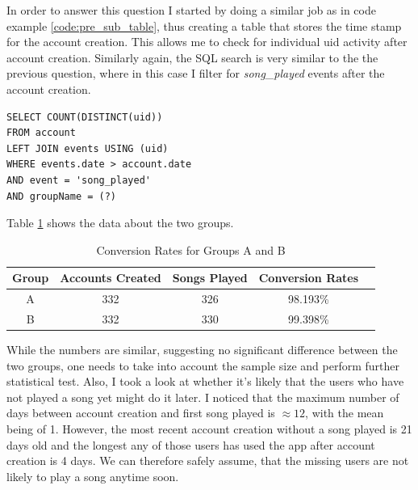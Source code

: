 \documentclass[paper=a4, fontsize=10pt]{report}
\begin{document}
\vspace{.8cm}

In order to answer this question I started by doing a similar job as in code example \ref{code:pre_sub_table}, thus creating a table that stores the time stamp
for the account creation. This allows me to check for individual uid activity after account creation. Similarly again, the SQL search is very similar to the 
the previous question, where in this case I filter for \textit{song\_played} events after the account creation.


\footnotesize
\begin{lstlisting}[frame=single,caption=Conversion rates \label{code:sql_conversion_rates}]
SELECT COUNT(DISTINCT(uid)) 
FROM account 
LEFT JOIN events USING (uid)
WHERE events.date > account.date
AND event = 'song_played'
AND groupName = (?)
\end{lstlisting}
\normalsize

Table \ref{tab:conversion_rates} shows the data about the two groups.
\begin{table}[htbp]
\normalsize

  \centering
  \caption{Conversion Rates for Groups A and B}
    \begin{tabular}{ccccc}
    \toprule
    \textbf{Group } & \textbf{Accounts Created} & \textbf{Songs Played} & \textbf{Conversion Rates} \\
    \midrule
    A & 332  &  326  & 98.193\%  \\
    B & 332   & 330   & 99.398\%   \\
    \bottomrule
    \end{tabular}%
  \label{tab:conversion_rates}%
\end{table}%
\normalsize
While the numbers are similar, suggesting no significant difference between the two groups, one needs to take into account the sample size and perform
further statistical test. Also, I took a look at whether it's likely that the users who have not played a song yet might
do it later. I noticed that the maximum number of days between account creation and first song played is $\approx 12$, with the mean
being of 1. However, the most recent account creation without a song played is 21 days old and the longest any of those
users has used the app after account creation is 4 days. We can therefore safely assume, that the missing users are not likely
to play a song anytime soon.
\end{document}
